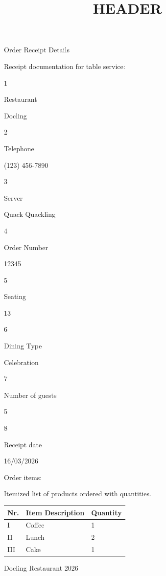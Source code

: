 \documentclass[11pt,a4paper]{article}
\title{HEADER}
\begin{document}
\maketitle

Order Receipt Details

Receipt documentation for table service:



1

Restaurant

Docling


2

Telephone

(123) 456-7890


3

Server

Quack Quackling


4

Order Number

12345


5

Seating

13


6

Dining Type

Celebration


7

Number of guests

5


8

Receipt date

16/03/2026

Order items:

Itemized list of products ordered with quantities.

\begin{table}[h]
\begin{tabular}{|l|l|l|}
\hline
Nr. & Item Description & Quantity \\ \hline
I & Coffee & 1 \\ \hline
II & Lunch & 2 \\ \hline
III & Cake & 1 \\ \hline
\end{tabular}
\end{table}

Docling Restaurant 2026
\end{document}
